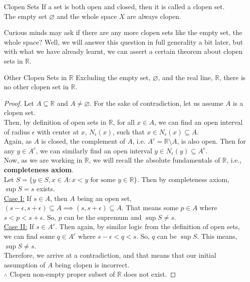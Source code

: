 \begin{Definition}{Clopen Sets}\label{clopen_sets}
    If a set is both open and closed, then it is called a clopen set.\\
    The empty set $\varnothing$ and the whole space $X$ are always clopen.
\end{Definition}
\noindent Curious minds may ask if there are any more clopen sets like the empty set, the whole space? Well, we will answer this question in full generality a bit later, but with what we have already learnt, we can assert a certain theorem about clopen sets in $\mathbb{R}$.
\begin{Theorem}{Other Clopen Sets in $\mathbb{R}$}\label{pther_clopen_sets_R}
    Excluding the empty set, $\varnothing$, and the real line, $\mathbb{R}$, there is no other clopen set in $\mathbb{R}$.
\end{Theorem}
\begin{proof}
    Let $A\subseteq\mathbb{R}$ and $A\neq\varnothing$. For the sake of contradiction, let us assume $A$ is a clopen set.\\
    Then, by definition of open sets in $\mathbb{R}$, for all $x\in A$, we can find an open interval of radius $\epsilon$ with center at $x$, $N_{\epsilon}(x)$, such that $x\in N_{\epsilon}(x)\subseteq A$.\\
    Again, as $A$ is closed, the complement of $A$, i.e. $A^c=\mathbb{R}\setminus A$, is also open. Then for any $y\in A^c$, we can similarly find an open interval $y\in N_{\epsilon}(y)\subseteq A^c$.\\
    Now, as we are working in $\mathbb{R}$, we will recall the absolute fundamentals of $\mathbb{R}$, i.e., \textbf{completeness axiom}.\\
    Let $S=\{y\in S,x\in A: x<y\text{ for some }y\in\mathbb{R}\}$. Then by completeness axiom, $\sup S=s$ exists.\\
    \underline{Case I:} If $s\in A$, then $A$ being an open set, $(s-\epsilon,s+\epsilon)\subseteq A\implies (s,s+\epsilon)\subseteq A$. That means some $p\in A$ where $s<p<s+\epsilon$. So, $p$ can be the supremum and $\sup S\neq s$.\\
    \underline{Case II:} If $s\in A^c$. Then again, by similar logic from the definition of open sets, we can find some $q\in A^c$ where $s-\epsilon<q<s$. So,  $q$ can be $\sup S$. This means, $\sup S\neq s$.\\
    Therefore, we arrive at a contradiction, and that means that our initial assumption of $A$ being clopen is incorrect.\\
    $\therefore$ Clopen non-empty proper subset of $\mathbb{R}$ does not exist.
\end{proof}
